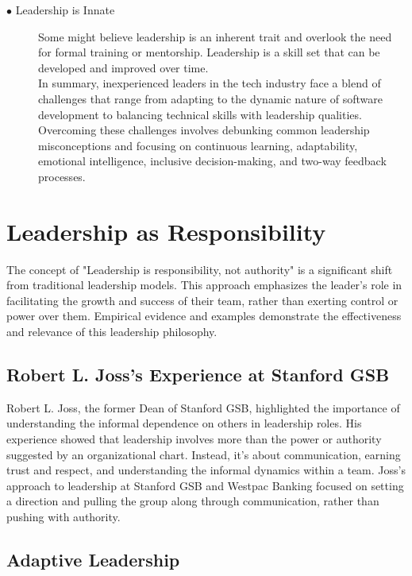 \documentclass[runningheads]{llncs}
\begin{document}
\begin{description}
 \item [$\bullet$ Leadership is Innate] Some might believe leadership is an inherent trait and overlook the need for formal training or mentorship. Leadership is a skill set that can be developed and improved over time. \cite{ref_21}
  \\

In summary, inexperienced leaders in the tech industry face a blend of challenges that range from adapting to the dynamic nature of software development to balancing technical skills with leadership qualities. Overcoming these challenges involves debunking common leadership misconceptions and focusing on continuous learning, adaptability, emotional intelligence, inclusive decision-making, and two-way feedback processes.
  \\

\end{description}

\section{Leadership as Responsibility}

The concept of "Leadership is responsibility, not authority" is a significant shift from traditional leadership models. This approach emphasizes the leader's role in facilitating the growth and success of their team, rather than exerting control or power over them. Empirical evidence and examples demonstrate the effectiveness and relevance of this leadership philosophy.

\subsection{Robert L. Joss's Experience at Stanford GSB}

Robert L. Joss, the former Dean of Stanford GSB, highlighted the importance of understanding the informal dependence on others in leadership roles. His experience showed that leadership involves more than the power or authority suggested by an organizational chart. Instead, it's about communication, earning trust and respect, and understanding the informal dynamics within a team. Joss's approach to leadership at Stanford GSB and Westpac Banking focused on setting a direction and pulling the group along through communication, rather than pushing with authority. \cite{ref_13}

\subsection{Adaptive Leadership}
\end{document}

